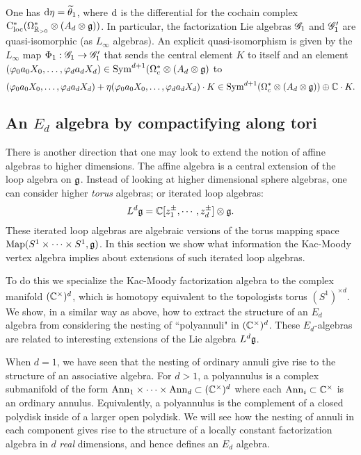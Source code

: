 \begin{lem} One has ${\rm d} \eta = \widetilde{\theta}_1$, where ${\rm d}$ is the differential for the cochain complex ${\rm C}_{\rm loc}^*(\Omega^*_{\mathbb R_{>0}} \otimes (A_d \otimes \mathfrak g))$. In particular, the factorization Lie algebras $\mathscr G_1$ and $\mathscr G_1'$ are quasi-isomorphic (as $L_\infty$ algebras). An explicit quasi-isomorphism is given by the $L_\infty$ map $\Phi_1 : \mathscr G_1 \to \mathscr G_1'$ that sends the central element $K$ to itself and an element $(\varphi_0 a_0 X_0,\ldots, \varphi_d a_d X_d) \in {\rm Sym}^{d+1}(\Omega^*_c \otimes (A_d \otimes \mathfrak g)$ to 
\[
(\varphi_0 a_0 X_0,\ldots, \varphi_d a_d X_d) + \eta(\varphi_0 a_0 X_0,\ldots, \varphi_d a_d X_d)\cdot K \in {\rm Sym}^{d+1}(\Omega^*_c \otimes (A_d \otimes \mathfrak g)) \oplus \mathbb C \cdot K .
\]
\end{lem}


\subsection{An $E_d$ algebra by compactifying along tori} 

There is another direction that one may look to extend the notion of affine algebras to higher dimensions.
The affine algebra is a central extension of the loop algebra on $\mathfrak g$. 
Instead of looking at higher dimensional sphere algebras, one can consider higher {\em torus} algebras; or iterated loop algebras:
\[
L^d \mathfrak g = \mathbb C[z_1^{\pm}, \cdots, z_d^{\pm}] \otimes \mathfrak g .
\]
These iterated loop algebras are algebraic versions of the torus mapping space ${\rm Map}(S^1 \times \cdots \times S^1, \mathfrak g)$. 
In this section we show what information the Kac-Moody vertex algebra implies about extensions of such iterated loop algebras.

To do this we specialize the Kac-Moody factorization algebra to the complex manifold $(\mathbb C^\times)^d$, which is homotopy equivalent to the topologists torus $(S^1)^{\times d}$.  
We show, in a similar way as above, how to extract the structure of an $E_d$ algebra from considering the nesting of ``polyannuli" in $(\mathbb C^\times)^d$.
These $E_d$-algebras are related to interesting extensions of the Lie algebra $L^d \mathfrak g$.

When $d=1$, we have seen that the nesting of ordinary annuli give rise to the structure of an associative algebra. For $d > 1$, a polyannulus is a complex submanifold of the form ${\rm Ann}_1 \times \cdots \times {\rm Ann}_d \subset (\mathbb C^\times)^d$ where each ${\rm Ann}_i \subset \mathbb C^\times$ is an ordinary annulus. Equivalently, a polyannulus is the complement of a closed polydisk inside of a larger open polydisk. We will see how the nesting of annuli in each component gives rise to the structure of a locally constant factorization algebra in $d$ {\em real} dimensions, and hence defines an $E_d$ algebra. 

